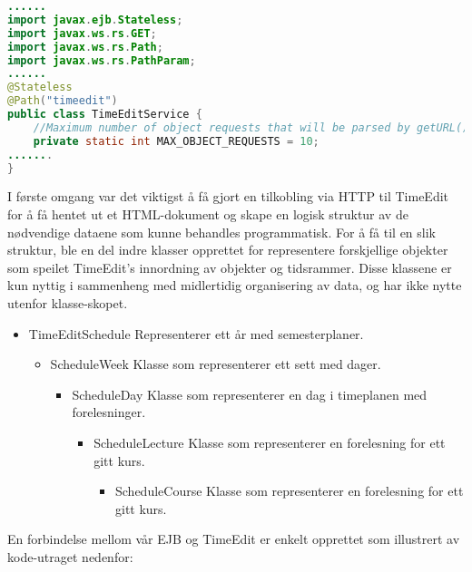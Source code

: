 \documentclass[../main.tex]{subfiles}
\begin{document}
\begin{lstlisting}[language=Java, frame=single, caption={Kodesnipp fra klassen TimeEditService, som er grovt kortet ned.}]
......
import javax.ejb.Stateless;
import javax.ws.rs.GET;
import javax.ws.rs.Path;
import javax.ws.rs.PathParam;
......
@Stateless
@Path("timeedit")
public class TimeEditService {
    //Maximum number of object requests that will be parsed by getURL()
    private static int MAX_OBJECT_REQUESTS = 10;
.......
}
\end{lstlisting}

I første omgang var det viktigst å få gjort en tilkobling via HTTP til TimeEdit for å få hentet ut et HTML-dokument og skape en logisk struktur av de nødvendige dataene som kunne behandles programmatisk. For å få til en slik struktur, ble en del indre klasser opprettet for representere forskjellige objekter som speilet TimeEdit’s innordning av objekter og tidsrammer. Disse klassene er kun nyttig i sammenheng med midlertidig organisering av data, og har ikke nytte utenfor klasse-skopet.

\begin{itemize}
\item TimeEditSchedule \newline Representerer ett år med semesterplaner.
\begin{itemize}
\item ScheduleWeek \newline Klasse som representerer ett sett med dager.
\begin{itemize}
\item ScheduleDay \newline Klasse som representerer en dag i timeplanen med forelesninger.
\begin{itemize}
\item ScheduleLecture \newline Klasse som representerer en forelesning for ett gitt kurs.
\begin{itemize}
\item ScheduleCourse \newline Klasse som representerer en forelesning for ett gitt kurs.
\end{itemize}
\end{itemize}
\end{itemize}
\end{itemize}
\end{itemize}

En forbindelse mellom vår EJB og TimeEdit er enkelt opprettet som illustrert av kode-utraget nedenfor:
\end{document}
